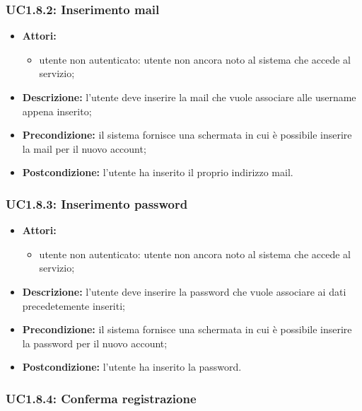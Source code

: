 \subsubsection{UC1.8.2: Inserimento mail}

\begin{itemize}
	\item \textbf{Attori:}
	\begin{itemize}
		\item utente non autenticato: utente non ancora noto al sistema che accede al servizio;
	\end{itemize}
	\item \textbf{Descrizione:} l'utente deve inserire la mail che vuole associare alle username appena inserito;
	\item \textbf{Precondizione:} il sistema fornisce una schermata in cui è possibile inserire la mail per il nuovo account;
	\item \textbf{Postcondizione:} l'utente ha inserito il proprio indirizzo mail.
\end{itemize}

\subsubsection{UC1.8.3: Inserimento password}

\begin{itemize}
	\item \textbf{Attori:}
	\begin{itemize}
		\item utente non autenticato: utente non ancora noto al sistema che accede al servizio;
	\end{itemize}
	\item \textbf{Descrizione:} l'utente deve inserire la password che vuole associare ai dati precedetemente inseriti;
	\item \textbf{Precondizione:} il sistema fornisce una schermata in cui è possibile inserire la password per il nuovo account;
	\item \textbf{Postcondizione:} l'utente ha inserito la password.
\end{itemize}

\subsubsection{UC1.8.4: Conferma registrazione}

